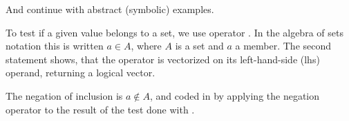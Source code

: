 \documentclass[krantz2]{krantz}\usepackage{knitr}%
\begin{document}
And continue with abstract (symbolic) examples.

\begin{knitrout}\footnotesize
{}\color{fgcolor}\begin{kframe}
\begin{alltt}
 \hlkwb{<-} \hlstd{(}\hlstd{,} \hlstd{,} \hlstd{,} \hlstd{)}
\end{alltt}
\end{kframe}
\end{knitrout}

To test if a given value belongs to a set, we use operator . In the algebra of sets notation this is written $a \in A$, where $A$ is a set and $a$ a member. The second statement shows, that the  operator is vectorized on its left-hand-side (lhs) operand, returning a logical vector.

\begin{knitrout}\footnotesize
{}\color{fgcolor}
\end{knitrout}

The negation of inclusion is $a \not\in A$, and coded in \Rlang by applying the negation operator \Roperator{!} to the result of the test done with .

\begin{knitrout}\footnotesize
{}\color{fgcolor}
\end{knitrout}
\end{document}
